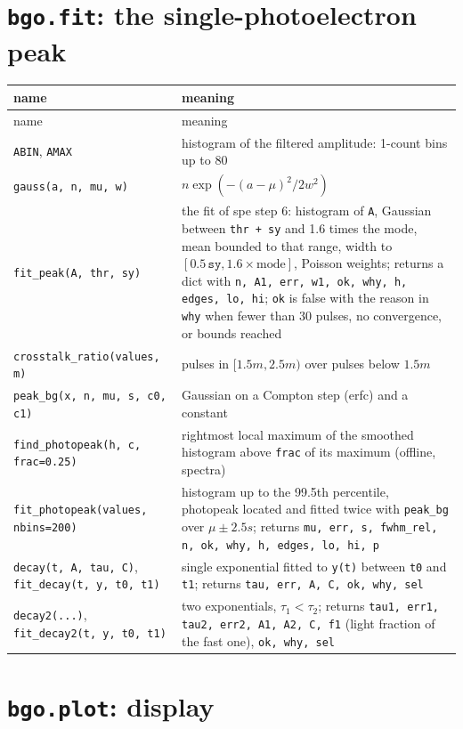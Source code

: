 \documentclass[11pt]{article}
\newcommand{\code}[1]{\texttt{#1}}
\begin{document}
\section{\code{bgo.fit}: the single-photoelectron peak}

\begin{longtable}{l p{92mm}}
\toprule
name & meaning \\
\midrule
\endfirsthead
\toprule
name & meaning \\
\midrule
\endhead
\code{ABIN}, \code{AMAX} & histogram of the filtered amplitude: 1-count bins up to 80 \\
\code{gauss(a, n, mu, w)} & $n \exp(-(a-\mu)^2 / 2w^2)$ \\
\code{fit\_peak(A, thr, sy)} & the fit of spe step 6: histogram of \code{A}, Gaussian between \code{thr + sy} and 1.6 times the mode, mean bounded to that range, width to $[0.5\,\code{sy}, 1.6 \times \mathrm{mode}]$, Poisson weights; returns a dict with \code{n, A1, err, w1, ok, why, h, edges, lo, hi}; \code{ok} is false with the reason in \code{why} when fewer than 30 pulses, no convergence, or bounds reached \\
\code{crosstalk\_ratio(values, m)} & pulses in $[1.5m, 2.5m)$ over pulses below $1.5m$ \\
\code{peak\_bg(x, n, mu, s, c0, c1)} & Gaussian on a Compton step (erfc) and a constant \\
\code{find\_photopeak(h, c, frac=0.25)} & rightmost local maximum of the smoothed histogram above \code{frac} of its maximum (offline, spectra) \\
\code{fit\_photopeak(values, nbins=200)} & histogram up to the 99.5th percentile, photopeak located and fitted twice with \code{peak\_bg} over $\mu \pm 2.5 s$; returns \code{mu, err, s, fwhm\_rel, n, ok, why, h, edges, lo, hi, p} \\
\code{decay(t, A, tau, C)}, \code{fit\_decay(t, y, t0, t1)} & single exponential fitted to \code{y(t)} between \code{t0} and \code{t1}; returns \code{tau, err, A, C, ok, why, sel} \\
\code{decay2(...)}, \code{fit\_decay2(t, y, t0, t1)} & two exponentials, $\tau_1 < \tau_2$; returns \code{tau1, err1, tau2, err2, A1, A2, C, f1} (light fraction of the fast one), \code{ok, why, sel} \\
\bottomrule
\end{longtable}

\section{\code{bgo.plot}: display}
\end{document}
